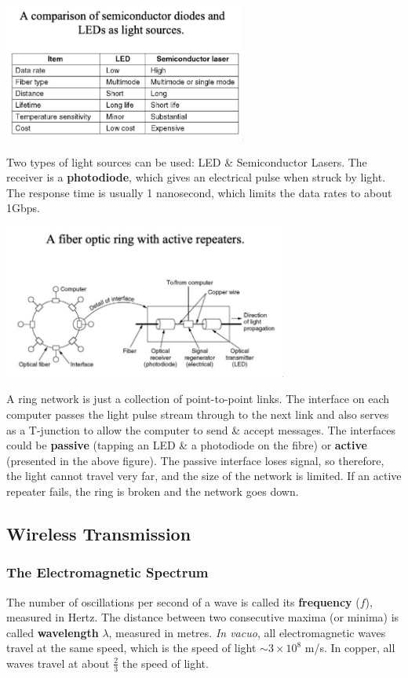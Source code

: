 \documentclass[11pt]{article}
\begin{document}
\begin{center}
    \includegraphics[width=0.6\textwidth]{compfibre.png}
\end{center}

Two types of light sources can be used: LED \& Semiconductor Lasers. 
The receiver is a \textbf{photodiode}, which gives an electrical pulse when struck by light. 
The response time is usually 1 nanosecond, which limits the data rates to about 1Gbps. 

\begin{center}
    \includegraphics[width=0.7\textwidth]{fibpotnet.png}
\end{center}

A ring network is just a collection of point-to-point links. 
The interface on each computer passes the light pulse stream through to the next link and also serves as a T-junction to allow the 
computer to send \& accept messages. 
The interfaces could be \textbf{passive} (tapping an LED \& a photodiode on the fibre) or \textbf{active} (presented in the above figure). 
The passive interface loses signal, so therefore, the light cannot travel very far, and the size of the network is limited.
If an active repeater fails, the ring is broken and the network goes down. 

\subsection{Wireless Transmission} 
\subsubsection{The Electromagnetic Spectrum}
The number of oscillations per second of a wave is called its \textbf{frequency} ($f$), measured in Hertz.
The distance between two consecutive maxima (or minima) is called \textbf{wavelength} $\lambda$, measured in metres.
\textit{In vacuo}, all electromagnetic waves travel at the same speed, which is the speed of light $\sim3 \times 10^8$ m/s. 
In copper, all waves travel at about $\frac{2}{3}$ the speed of light.
\end{document}
